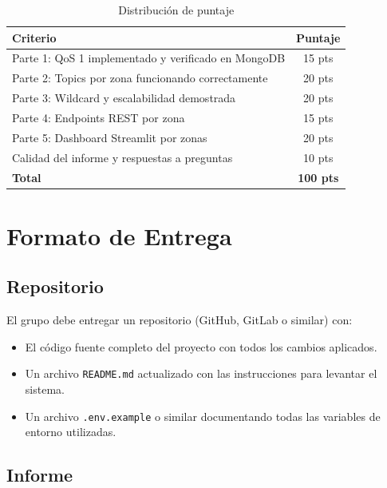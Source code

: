 \documentclass[12pt,a4paper]{article}
\begin{document}
\begin{table}[h]
\centering
\begin{tabular}{p{7cm}c}
\toprule
\textbf{Criterio} & \textbf{Puntaje} \\
\midrule
Parte 1: QoS 1 implementado y verificado en MongoDB & 15 pts \\
Parte 2: Topics por zona funcionando correctamente & 20 pts \\
Parte 3: Wildcard y escalabilidad demostrada & 20 pts \\
Parte 4: Endpoints REST por zona & 15 pts \\
Parte 5: Dashboard Streamlit por zonas & 20 pts \\
Calidad del informe y respuestas a preguntas & 10 pts \\
\midrule
\textbf{Total} & \textbf{100 pts} \\
\bottomrule
\end{tabular}
\caption{Distribución de puntaje}
\end{table}

\section{Formato de Entrega}

\subsection{Repositorio}

El grupo debe entregar un repositorio (GitHub, GitLab o similar) con:
\begin{itemize}
  \item El código fuente completo del proyecto con todos los cambios aplicados.
  \item Un archivo \texttt{README.md} actualizado con las instrucciones para
        levantar el sistema.
  \item Un archivo \texttt{.env.example} o similar documentando todas las
        variables de entorno utilizadas.
\end{itemize}

\subsection{Informe}
\end{document}
